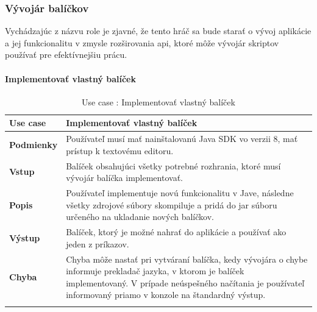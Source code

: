 \subsubsection{Vývojár balíčkov}
\indent Vychádzajúc z názvu role je zjavné, že tento hráč sa bude starať o vývoj aplikácie a jej funkcionalitu v zmysle rozširovania \acrshort{api}, ktoré môže vývojár skriptov používať pre efektívnejšiu prácu.
\paragraph{Implementovať vlastný balíček}
\begin{center}
	\begin{longtable}{|p{2.5cm}|p{12.2cm}|}
		
			\hline
			\textbf{Use case} & Implementovať vlastný balíček \\ 
			\hline
			\textbf{Podmienky} & Používateľ musí mať nainštalovanú Java SDK vo verzii 8, mať prístup k textovému editoru.  \\ 
			\hline
			\textbf{Vstup} & Balíček obsahujúci všetky potrebné rozhrania, ktoré musí vývojár balíčka implementovať.\\
			\hline
			\textbf{Popis} & Používateľ implementuje novú funkcionalitu v Jave, následne všetky zdrojové súbory skompiluje a pridá do \acrshort{jar} súboru určeného na ukladanie nových balíčkov.\\ 
			\hline
			\textbf{Výstup} & Balíček, ktorý je možné nahrať do aplikácie a používať ako jeden z príkazov.\\
			\hline
			\textbf{Chyba} & Chyba môže nastať pri vytváraní balíčka, kedy vývojára o chybe informuje prekladač jazyka, v ktorom je balíček implementovaný. V prípade neúspešného načítania je používateľ informovaný priamo v konzole na štandardný výstup.\\
			\hline
		\caption{Use case : Implementovať vlastný balíček}
		\label{table:1}
		
	\end{longtable}
\end{center}

